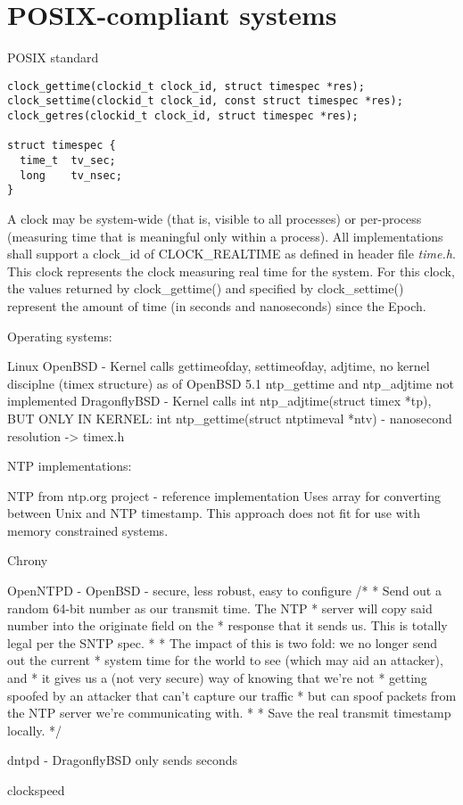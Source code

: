
\section{POSIX-compliant systems}\label{sec:others-posix}
POSIX standard
\begin{lstlisting}[morekeywords={clockid_t,time_t}]
clock_gettime(clockid_t clock_id, struct timespec *res);
clock_settime(clockid_t clock_id, const struct timespec *res);
clock_getres(clockid_t clock_id, struct timespec *res);

struct timespec {
  time_t  tv_sec;
  long    tv_nsec;
}
\end{lstlisting}
A clock may be system-wide (that is, visible to all processes)
or per-process (measuring time that is meaningful only within a process).
All implementations shall support a clock\_id of CLOCK\_REALTIME as
defined in header file {\it{time.h}}.
This clock represents the clock measuring real time for the system.
For this clock, the values returned by clock\_gettime() and specified
by clock\_settime() represent the amount
of time (in seconds and nanoseconds) since the Epoch.


Operating systems:

Linux
OpenBSD - Kernel calls gettimeofday, settimeofday, adjtime, no kernel disciplne (timex structure)
as of OpenBSD 5.1 ntp\_gettime and ntp\_adjtime not implemented
DragonflyBSD - Kernel calls int ntp\_adjtime(struct timex *tp),
BUT ONLY IN KERNEL: int ntp\_gettime(struct ntptimeval *ntv) - nanosecond resolution -> timex.h

NTP implementations:

NTP from ntp.org project - reference implementation
Uses array for converting between Unix and NTP timestamp.
This approach does not fit for use with memory constrained systems.

Chrony

OpenNTPD - OpenBSD - secure, less robust, easy to configure
	/*
	 * Send out a random 64-bit number as our transmit time.  The NTP
	 * server will copy said number into the originate field on the
	 * response that it sends us.  This is totally legal per the SNTP spec.
	 *
	 * The impact of this is two fold: we no longer send out the current
	 * system time for the world to see (which may aid an attacker), and
	 * it gives us a (not very secure) way of knowing that we're not
	 * getting spoofed by an attacker that can't capture our traffic
	 * but can spoof packets from the NTP server we're communicating with.
	 *
	 * Save the real transmit timestamp locally.
	 */

dntpd - DragonflyBSD
only sends seconds


clockspeed
